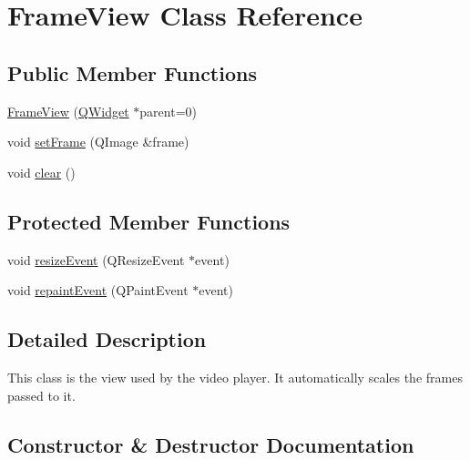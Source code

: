 \hypertarget{classGUI_1_1Player_1_1FrameView}{}\section{Frame\+View Class Reference}
\label{classGUI_1_1Player_1_1FrameView}
\subsection*{Public Member Functions}
\begin{DoxyCompactItemize}
\item 
\hyperlink{classGUI_1_1Player_1_1FrameView_a75ab7862211fa66433f92fc148ba9e7d}{Frame\+View} (\hyperlink{classGUI_1_1Player_1_1QWidget}{Q\+Widget} $\ast$parent=0)
\item 
void \hyperlink{classGUI_1_1Player_1_1FrameView_ab38693f5302565670675156a8f33d77c}{set\+Frame} (Q\+Image \&frame)
\item 
void \hyperlink{classGUI_1_1Player_1_1FrameView_ac8bb3912a3ce86b15842e79d0b421204}{clear} ()
\end{DoxyCompactItemize}
\subsection*{Protected Member Functions}
\begin{DoxyCompactItemize}
\item 
void \hyperlink{classGUI_1_1Player_1_1FrameView_a6fbc07cec19868c41d513b9ef8343e9a}{resize\+Event} (Q\+Resize\+Event $\ast$event)
\item 
void \hyperlink{classGUI_1_1Player_1_1FrameView_a67e5a053c3728683d415a35d1eafa5c2}{repaint\+Event} (Q\+Paint\+Event $\ast$event)
\end{DoxyCompactItemize}


\subsection{Detailed Description}
This class is the view used by the video player. It automatically scales the frames passed to it. 

\subsection{Constructor \& Destructor Documentation}
\hypertarget{classGUI_1_1Player_1_1FrameView_a75ab7862211fa66433f92fc148ba9e7d}{}
